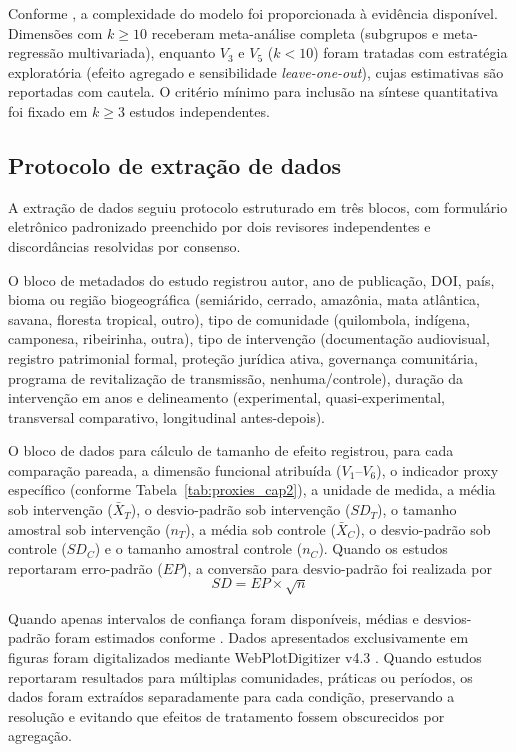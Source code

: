 Conforme , a complexidade do modelo foi proporcionada à evidência disponível. Dimensões com $k \geq 10$ receberam meta-análise completa (subgrupos e meta-regressão multivariada), enquanto $V_3$ e $V_5$ ($k < 10$) foram tratadas com estratégia exploratória (efeito agregado e sensibilidade \textit{leave-one-out}), cujas estimativas são reportadas com cautela. O critério mínimo para inclusão na síntese quantitativa foi fixado em $k \geq 3$ estudos independentes.

\subsection{Protocolo de extração de dados}
\label{sec:extraction_cap2}

A extração de dados seguiu protocolo estruturado em três blocos, com formulário eletrônico padronizado preenchido por dois revisores independentes e discordâncias resolvidas por consenso.

O bloco de metadados do estudo registrou autor, ano de publicação, DOI, país, bioma ou região biogeográfica (semiárido, cerrado, amazônia, mata atlântica, savana, floresta tropical, outro), tipo de comunidade (quilombola, indígena, camponesa, ribeirinha, outra), tipo de intervenção (documentação audiovisual, registro patrimonial formal, proteção jurídica ativa, governança comunitária, programa de revitalização de transmissão, nenhuma/controle), duração da intervenção em anos e delineamento (experimental, quasi-experimental, transversal comparativo, longitudinal antes-depois).

O bloco de dados para cálculo de tamanho de efeito registrou, para cada comparação pareada, a dimensão funcional atribuída ($V_1$--$V_6$), o indicador proxy específico (conforme Tabela~\ref{tab:proxies_cap2}), a unidade de medida, a média sob intervenção ($\bar{X}_T$), o desvio-padrão sob intervenção ($SD_T$), o tamanho amostral sob intervenção ($n_T$), a média sob controle ($\bar{X}_C$), o desvio-padrão sob controle ($SD_C$) e o tamanho amostral controle ($n_C$). Quando os estudos reportaram erro-padrão ($EP$), a conversão para desvio-padrão foi realizada por
%
\begin{equation}
SD = EP \times \sqrt{n}
\label{eq:sd-ep_cap2}
\end{equation}

\noindent Quando apenas intervalos de confiança foram disponíveis, médias e desvios-padrão foram estimados conforme . Dados apresentados exclusivamente em figuras foram digitalizados mediante WebPlotDigitizer v4.3 \cite{Rohatgi2020}. Quando estudos reportaram resultados para múltiplas comunidades, práticas ou períodos, os dados foram extraídos separadamente para cada condição, preservando a resolução e evitando que efeitos de tratamento fossem obscurecidos por agregação.

